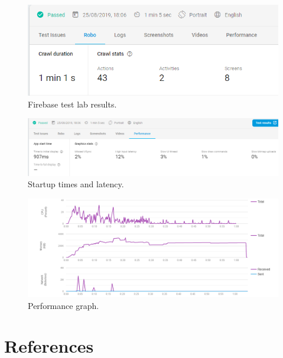 \documentclass[]{article}
\begin{document}
\begin{flushleft}
\begin{figure}[H]
	\includegraphics[width=\linewidth]{test1.png}
	\caption{Firebase test lab results.}
	\label{fig:test1}
\end{figure}

\begin{figure}[H]
	\includegraphics[width=\linewidth]{test2.png}
	\caption{Startup times and latency.}
	\label{fig:test2}
\end{figure}

\begin{figure}[H]
	\includegraphics[width=\linewidth]{test3.png}
	\caption{Performance graph.}
	\label{fig:test3}
\end{figure}



\section{References}
\printbibliography[title={Online sources}]
\end{flushleft}
\end{document}
